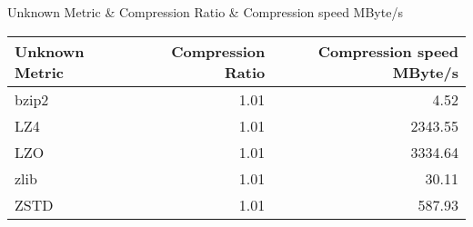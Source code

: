 \begin{tabular}{}
\hline
 Unknown Metric   & Compression Ratio   & Compression speed MByte/s   \\
\hline
\hline
\end{tabular}
\begin{tabular}{lrr}
\hline
 Unknown Metric   &   Compression Ratio &   Compression speed MByte/s \\
\hline
 bzip2            &                1.01 &                        4.52 \\
 LZ4              &                1.01 &                     2343.55 \\
 LZO              &                1.01 &                     3334.64 \\
 zlib             &                1.01 &                       30.11 \\
 ZSTD             &                1.01 &                      587.93 \\
\hline
\end{tabular}